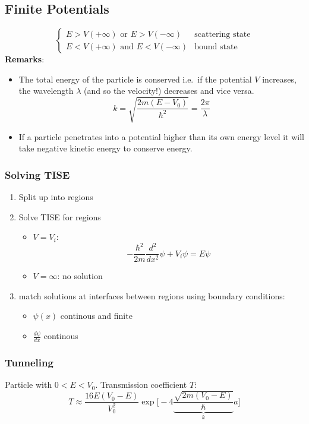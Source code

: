\subsection{Finite Potentials}
\noindent\begin{equation*}
    \begin{cases}
        E > V(+\infty)\text{ or } E > V(-\infty)  & \text{scattering state} \\
        E < V(+\infty)\text{ and } E < V(-\infty) & \text{bound state}
    \end{cases}
\end{equation*}
\textbf{Remarks}:

\begin{itemize}
    \item The total energy of the particle is conserved i.e.\ if the potential $V$ increases, the wavelength $\lambda$ (and so the velocity!) decreases and vice versa.
          \noindent\begin{equation*}
              k=\sqrt{\frac{2m(E-V_0)}{\hbar^2}} = \frac{2\pi}{\lambda}
          \end{equation*}
    \item If a particle penetrates into a potential higher than its own energy level it will take negative kinetic energy to conserve energy.
\end{itemize}

\subsubsection{Solving TISE}
\begin{enumerate}
    \item Split up into regions
    \item Solve TISE for regions
          \begin{itemize}
              \item $V=V_i$:
                    \noindent\begin{equation*}
                        -\frac{\hbar^2}{2m}\frac{d^2}{dx^2} \psi + V_i\psi=E\psi
                    \end{equation*}
              \item $V=\infty$: no solution
          \end{itemize}
    \item match solutions at interfaces between regions using boundary conditions:
          \begin{itemize}
              \item $\psi(x)$ continous and finite
              \item $\frac{d\psi}{dx}$ continous
          \end{itemize}
\end{enumerate}

\subsubsection{Tunneling}
Particle with $0<E<V_0$. Transmission coefficient $T$:
\noindent\begin{equation*}
    T\approx\frac{16E(V_0-E)}{V_0^2}\exp\Biggl[-4 \underbrace{\frac{\sqrt{2m(V_0-E)}}{\hbar}}_{k} a\Biggr]
\end{equation*}
